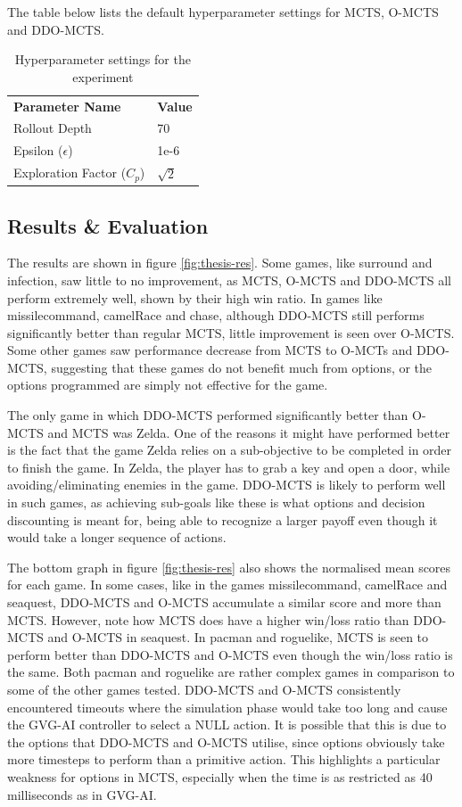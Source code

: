 \documentclass[12pt,a4paper]{article}
\begin{document}
\begin{multicols}{2}
The table below lists the default hyperparameter settings for MCTS, O-MCTS and DDO-MCTS.

\begin{table}[H]
\centering
\begin{tabular}{ll}
\textbf{Parameter Name} & \textbf{Value} \\
Rollout Depth           & 70             \\
Epsilon ($\epsilon$)                 & 1e-6           \\
Exploration Factor ($C_p$)  & $\sqrt{2}$       
\end{tabular}
\caption{Hyperparameter settings for the experiment}
\end{table}

\subsection{Results & Evaluation}
The results are shown in figure \ref{fig:thesis-res}. Some games, like surround and infection, saw little to no improvement, as MCTS, O-MCTS and DDO-MCTS all perform extremely well, shown by their high win ratio. In games like missilecommand, camelRace and chase, although DDO-MCTS still performs significantly better than regular MCTS, little improvement is seen over O-MCTS. Some other games saw performance decrease from MCTS to O-MCTs and DDO-MCTS, suggesting that these games do not benefit much from options, or the options programmed are simply not effective for the game.

The only game in which DDO-MCTS performed significantly better than O-MCTS and MCTS was Zelda. One of the reasons it might have performed better is the fact that the game Zelda relies on a sub-objective to be completed in order to finish the game. In Zelda, the player has to grab a key and open a door, while avoiding/eliminating enemies in the game. DDO-MCTS is likely to perform well in such games, as achieving sub-goals like these is what options and decision discounting is meant for, being able to recognize a larger payoff even though it would take a longer sequence of actions.

The bottom graph in figure \ref{fig:thesis-res} also shows the normalised mean scores for each game. In some cases, like in the games missilecommand, camelRace and seaquest, DDO-MCTS and O-MCTS accumulate a similar score and more than MCTS. However, note how MCTS does have a higher win/loss ratio than DDO-MCTS and O-MCTS in seaquest. In pacman and roguelike, MCTS is seen to perform better than DDO-MCTS and O-MCTS even though the win/loss ratio is the same. Both pacman and roguelike are rather complex games in comparison to some of the other games tested. DDO-MCTS and O-MCTS consistently encountered timeouts where the simulation phase would take too long and cause the GVG-AI controller to select a NULL action. It is possible that this is due to the options that DDO-MCTS and O-MCTS utilise, since options obviously take more timesteps to perform than a primitive action. This highlights a particular weakness for options in MCTS, especially when the time is as restricted as 40 milliseconds as in GVG-AI.


\end{multicols}
\end{document}
